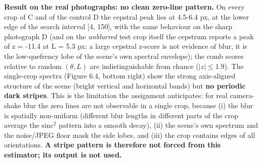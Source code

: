 \documentclass[10pt,a4paper]{article}
\begin{document}
\textbf{Result on the real photographs: no clean zero-line pattern.} On every crop of C and of the control D the cepstral peak lies at 4.5-6.4 px, at the lower edge of the search interval [4, 150], with the same behaviour on the sharp photograph D (and on the \textit{unblurred} test crop itself the cepstrum reports a peak of z = -11.4 at L = 5.3 px: a large cepstral z-score is not evidence of blur, it is the low-quefrency lobe of the scene's own spectral envelope); the comb scores relative to random $(\theta,L)$ are indistinguishable from chance ($|z|\le1.9$). The single-crop spectra (Figure 6.4, bottom right) show the strong axis-aligned structure of the scene (bright vertical and horizontal bands) but \textbf{no periodic dark stripes}. This is the limitation the assignment anticipates: for real camera-shake blur the zero lines are not observable in a single crop, because (i) the blur is spatially non-uniform (different blur lengths in different parts of the crop average the sinc$^2$ pattern into a smooth decay), (ii) the scene's own spectrum and the noise/JPEG floor mask the side lobes, and (iii) the crop contains edges of all orientations. \textbf{A stripe pattern is therefore not forced from this estimator; its output is not used.}
\end{document}
